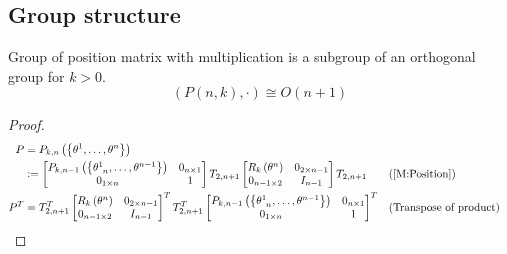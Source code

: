 \documentclass[../main.tex]{subfiles}
\begin{document}
\subsection{Group structure}
\begin{proposition}
    Group of position matrix with multiplication is a subgroup of an orthogonal group for $k>0$.
    \begin{equation*}
        \left(P\left(n, k\right),\cdot\right)\cong O\left(n+1\right)
    \end{equation*}
\end{proposition}
\begin{proof}
    \begin{align*}
        P&=P_{k,n}\left(\left\{\tensor{\theta}{^1},\dots,\tensor{\theta}{^n}\right\}\right) \\
        &\defeq
        \begin{bmatrix}
            P_{k,n-1}\left(\left\{\tensor{\theta}{^1_{n}},\dots,\tensor{\theta}{^{n-1}}\right\}\right) & 0_{n\times 1} \\
            0_{1\times n}                                                                              & 1             \\
        \end{bmatrix}
        T_{2,n+1}
        \begin{bmatrix}
            R_k\left(\tensor{\theta}{^n}\right) & 0_{{2}\times{n-1}} \\
            0_{{n-1}\times{2}}                  & {I}_{n-1}          \\
        \end{bmatrix}
        T_{2,n+1} && \text{(\cref{M:Position})} \\
        P^T
        &=
        T_{2,n+1}^T
        \begin{bmatrix}
            R_k\left(\tensor{\theta}{^n}\right) & 0_{{2}\times{n-1}} \\
            0_{{n-1}\times{2}}                  & {I}_{n-1}          \\
        \end{bmatrix}^T
        T_{2,n+1}^T
        \begin{bmatrix}
            P_{k,n-1}\left(\left\{\tensor{\theta}{^1_{n}},\dots,\tensor{\theta}{^{n-1}}\right\}\right) & 0_{n\times 1} \\
            0_{1\times n}                                                                              & 1             \\
        \end{bmatrix}^T && \text{(Transpose of product)} \\

\end{align*}
\end{proof}
\end{document}
